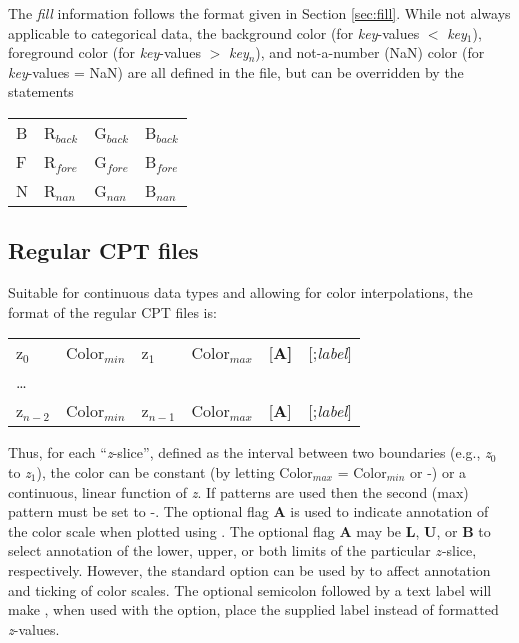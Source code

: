 The {\it fill} information follows the format given in Section \ref{sec:fill}.
While not always applicable to categorical data, the background color (for
\emph{key}-values $<$ \emph{key$_1$}), foreground color
(for \emph{key}-values $>$ \emph{key$_{n}$}), and not-a-number (NaN) color (for
\emph{key}-values = NaN) are all defined in the 
file, but can be overridden by the statements

\begin{center}
\begin{tabular}{llll}
B &  R$_{back}$ &  G$_{back}$ &  B$_{back}$ \\ 
F &  R$_{fore}$ &  G$_{fore}$ &  B$_{fore}$ \\ 
N &  R$_{nan}$ &  G$_{nan}$ &  B$_{nan}$ \\
\end{tabular}
\end{center}

\subsection{Regular CPT files}

Suitable for continuous data types and allowing for color interpolations, the
format of the regular CPT files is: 

\begin{center}
\begin{tabular}{llllll}
z$_0$ &  Color$_{min}$  &  z$_1$ & Color$_{max}$ &  [\bf{A}] & [;\emph{label}] \\ 
\ldots & & & & & \\ 
z$_{n-2}$ &  Color$_{min}$ &  z$_{n-1}$ &  Color$_{max}$ &  [{\bf A}] & [;\emph{label}] \\
\end{tabular} 
\end{center}

Thus, for each ``\emph{z}-slice'', defined as the interval between two boundaries
(e.g., \emph{z$_0$} to \emph{z$_1$}), the color can be constant (by letting Color$_{max}$
= Color$_{min}$ or -) or a continuous, linear function of \emph{z}.  If patterns are
used then the second (max) pattern must be set to -.  The optional flag \textbf{A} is used to indicate annotation
of the color scale when plotted using .  The optional flag \textbf{A} may be \textbf{L},
\textbf{U}, or \textbf{B} to select annotation of the lower, upper, or both limits
of the particular $z$-slice, respectively.  However, the standard  option can be used
by  to affect annotation and ticking of color scales.  The optional
semicolon followed by a text label will make , when used with the  option,
place the supplied label instead of formatted \emph{z}-values.

